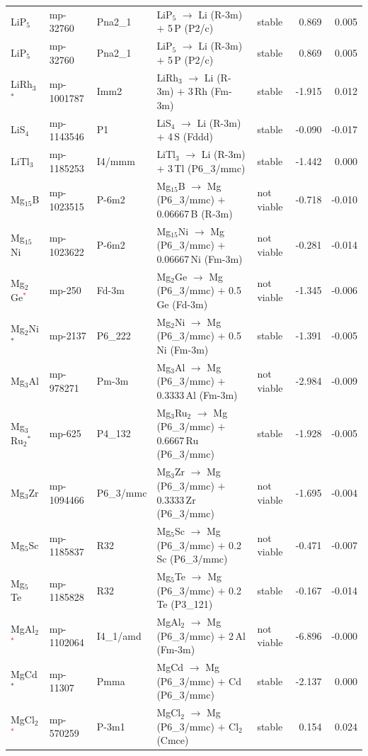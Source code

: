 \begin{longtable}{@{}ll l@{\hspace{4pt}} p{4.6cm} l@{\hspace{4pt}} rr@{}}
LiP$_{5}$ & mp-32760 & Pna2\_1 & LiP$_{5}$ $\to$ Li (R-3m) $+$ 5\,P (P2/c) & stable & 0.869 & 0.005 \\
LiP$_{5}$ & mp-32760 & Pna2\_1 & LiP$_{5}$ $\to$ Li (R-3m) $+$ 5\,P (P2/c) & stable & 0.869 & 0.005 \\
LiRh$_{3}$$^*$ & mp-1001787 & Imm2 & LiRh$_{3}$ $\to$ Li (R-3m) $+$ 3\,Rh (Fm-3m) & stable & -1.915 & 0.012 \\
LiS$_{4}$ & mp-1143546 & P1 & LiS$_{4}$ $\to$ Li (R-3m) $+$ 4\,S (Fddd) & stable & -0.090 & -0.017 \\
LiTl$_{3}$ & mp-1185253 & I4/mmm & LiTl$_{3}$ $\to$ Li (R-3m) $+$ 3\,Tl (P6\_3/mmc) & stable & -1.442 & 0.000 \\
Mg$_{15}$B & mp-1023515 & P-6m2 & Mg$_{15}$B $\to$ Mg (P6\_3/mmc) $+$ 0.06667\,B (R-3m) & not viable & -0.718 & -0.010 \\
Mg$_{15}$Ni & mp-1023622 & P-6m2 & Mg$_{15}$Ni $\to$ Mg (P6\_3/mmc) $+$ 0.06667\,Ni (Fm-3m) & not viable & -0.281 & -0.014 \\
Mg$_{2}$Ge\textcolor{red}{$^*$} & mp-250 & Fd-3m & Mg$_{2}$Ge $\to$ Mg (P6\_3/mmc) $+$ 0.5\,Ge (Fd-3m) & not viable & -1.345 & -0.006 \\
Mg$_{2}$Ni$^*$ & mp-2137 & P6\_222 & Mg$_{2}$Ni $\to$ Mg (P6\_3/mmc) $+$ 0.5\,Ni (Fm-3m) & stable & -1.391 & -0.005 \\
Mg$_{3}$Al & mp-978271 & Pm-3m & Mg$_{3}$Al $\to$ Mg (P6\_3/mmc) $+$ 0.3333\,Al (Fm-3m) & not viable & -2.984 & -0.009 \\
Mg$_{3}$Ru$_{2}$$^*$ & mp-625 & P4\_132 & Mg$_{3}$Ru$_{2}$ $\to$ Mg (P6\_3/mmc) $+$ 0.6667\,Ru (P6\_3/mmc) & stable & -1.928 & -0.005 \\
Mg$_{3}$Zr & mp-1094466 & P6\_3/mmc & Mg$_{3}$Zr $\to$ Mg (P6\_3/mmc) $+$ 0.3333\,Zr (P6\_3/mmc) & not viable & -1.695 & -0.004 \\
Mg$_{5}$Sc & mp-1185837 & R32 & Mg$_{5}$Sc $\to$ Mg (P6\_3/mmc) $+$ 0.2\,Sc (P6\_3/mmc) & not viable & -0.471 & -0.007 \\
Mg$_{5}$Te & mp-1185828 & R32 & Mg$_{5}$Te $\to$ Mg (P6\_3/mmc) $+$ 0.2\,Te (P3\_121) & stable & -0.167 & -0.014 \\
MgAl$_{2}$\textcolor{red}{$^*$} & mp-1102064 & I4\_1/amd & MgAl$_{2}$ $\to$ Mg (P6\_3/mmc) $+$ 2\,Al (Fm-3m) & not viable & -6.896 & -0.000 \\
MgCd$^*$ & mp-11307 & Pmma & MgCd $\to$ Mg (P6\_3/mmc) $+$ Cd (P6\_3/mmc) & stable & -2.137 & 0.000 \\
MgCl$_{2}$\textcolor{red}{$^*$} & mp-570259 & P-3m1 & MgCl$_{2}$ $\to$ Mg (P6\_3/mmc) $+$ Cl$_{2}$ (Cmce) & stable & 0.154 & 0.024 \\

\end{longtable}
